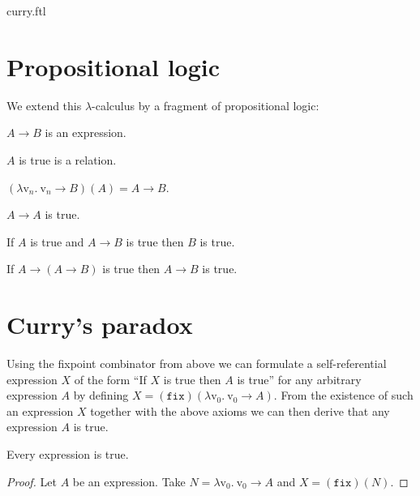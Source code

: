 \documentclass{stex}
\newcommand{\var}[1]{\mathrm{v}_{#1}}
\newcommand{\abs}[2]{\lambda\var{#1}.\ #2}
\newcommand{\app}[2]{(#1)(#2)}
\newcommand{\fix}{\mathtt{fix}}
\begin{document}
\begin{smodule}{curry.ftl}
  \section*{Propositional logic}

  \noindent We extend this $\lambda$-calculus by a fragment of propositional logic:

  \begin{forthel}
    \begin{signature*}[Implication]\label{implication}
      $A \rightarrow B$ is an expression.
    \end{signature*}

    \begin{signature*}\label{truth}
      $A$ is true is a relation.
    \end{signature*}

    \begin{axiom}\label{beta_reduction}
      $\app{\abs{n}{\var{n} \rightarrow B}}{A} = A \rightarrow B$.
    \end{axiom}

    \begin{axiom}\label{reflexivity}
      $A \rightarrow A$ is true.
    \end{axiom}

    \begin{axiom}\label{modus_ponens}
      If $A$ is true and $A \rightarrow B$ is true then $B$ is true.
    \end{axiom}

    \begin{axiom}\label{strengthening}
      If $A \rightarrow (A \rightarrow B)$ is true then $A \rightarrow B$ is true.
    \end{axiom}
  \end{forthel}


  \section*{Curry's paradox}

  \noindent Using the fixpoint combinator from above we can formulate a self-referential expression $X$ of the form “If $X$ is true then $A$ is true” for any arbitrary expression $A$ by defining $X = \app{\fix}{\abs{0}{\var{0} \rightarrow A}}$.
  From the existence of such an expression $X$ together with the above axioms we can then derive that any expression $A$ is true.

  \begin{forthel}
    \begin{theorem*}\label{curry_paradox}
      Every expression is true.
    \end{theorem*}
    \begin{proof}
      Let $A$ be an expression.
      Take $N = \abs{0}{\var{0} \rightarrow A}$ and $X = \app{\fix}{N}.$


\end{proof}
\end{forthel}
\end{smodule}
\end{document}
